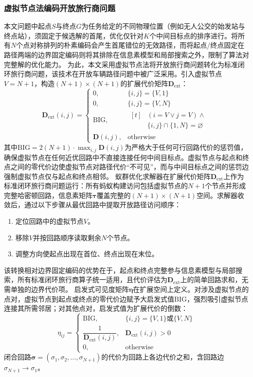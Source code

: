\documentclass[lettersize,journal]{IEEEtran}
\begin{document}
\subsubsection{虚拟节点法编码开放旅行商问题}
\label{subsec:virtual}
本文问题中起点$S$与终点$G$为任务给定的不同物理位置（例如无人公交的始发站与终点站），须固定于候选解的首尾，优化仅针对$K$个中间目标点的排序进行。将所有$N$个点对称排列的朴素编码会产生首尾错位的无效路径，而将起点/终点固定在路径两端的边界固定编码则将其排除在信息素模型和局部搜索之外，限制了算法对完整解的优化能力。
为此，本文采用虚拟节点法将开放旅行商问题转化为标准闭环旅行商问题，该技术在开放车辆路径问题中被广泛采用\textcolor{blue}{\cite{ref31,ref32}}。引入虚拟节点$V = N + 1$，构造$(N+1) \times (N+1)$的扩展代价矩阵$\mathbf{D}_{\mathrm{ext}}$：
\begin{equation}
\mathbf{D}_{\mathrm{ext}}(i, j) =
\begin{cases}
0, & \{i, j\} = \{V, 1\} \\
0, & \{i, j\} = \{V, N\} \\
\mathrm{BIG}, & \begin{aligned}[t]
& (i = V \lor j = V) \land \\
& \{i, j\} \cap \{1, N\} = \varnothing
\end{aligned} \\
\mathbf{D}(i, j), & \text{otherwise}
\end{cases}
\label{eq:dext}
\end{equation}
其中$\mathrm{BIG} = 2(N+1) \cdot \max_{i,j} \mathbf{D}(i,j)$为严格大于任何可行回路代价的惩罚值，确保虚拟节点在任何近优回路中不直接连接任何中间目标点。虚拟节点与起点和终点之间的零代价边使虚拟节点对路径代价``不可见''，而与中间目标点之间的惩罚边强制虚拟节点仅与起点和终点相邻。
蚁群优化求解器在扩展代价矩阵$\mathbf{D}_{\mathrm{ext}}$上作为标准闭环旅行商问题运行：所有蚂蚁构建访问包括虚拟节点的$N+1$个节点并形成完整哈密顿回路，信息素矩阵$\bm{\tau}$覆盖完整的$(N+1) \times (N+1)$空间。求解器收敛后，通过以下步骤从最优回路中提取开放路径访问顺序：
\begin{enumerate}
\item 定位回路中的虚拟节点$V$。
\item 移除$V$并按回路顺序读取剩余$N$个节点。
\item 调整方向使起点出现在首位、终点出现在末位。
\end{enumerate}
该转换相对边界固定编码的优势在于，起点和终点完整参与信息素模型与局部搜索，所有标准闭环旅行商算子统一适用，且代价评估为$\mathbf{D}_{\mathrm{ext}}$上的简单回路求和，无需单独的边界代价项。
启发式可见度矩阵$\bm{\eta}$在扩展空间上定义。对涉及虚拟节点的点对，虚拟节点到起点或终点的零代价边赋予大启发式值$\mathrm{BIG}$，强烈吸引虚拟节点连接其所需邻居；对其他点对，启发式值为扩展代价的倒数：
\begin{equation}
\eta_{ij} =
\begin{cases}
\mathrm{BIG}, & \{i, j\} = \{V, 1\} \text{或} \{V, N\} \\
\dfrac{1}{\mathbf{D}_{\mathrm{ext}}(i,j)}, & \mathbf{D}_{\mathrm{ext}}(i,j) > 0 \\
0, & \text{otherwise}
\end{cases}
\label{eq:eta}
\end{equation}
闭合回路$\bm{\sigma} = (\sigma_1, \sigma_2, \dots, \sigma_{N+1})$的代价为回路上各边代价之和，含回路边$\sigma_{N+1} \to \sigma_1$。
\end{document}
